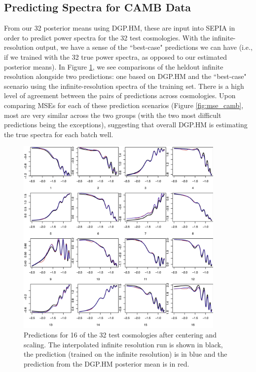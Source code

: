 \documentclass[11pt]{article}
\begin{document}
\subsection{Predicting Spectra for CAMB Data}
\label{subsec:camb_pred}

From our 32 posterior means using DGP.HM, these are input into SEPIA in order to predict power spectra
for the 32 test cosmologies. With the infinite-resolution output, we have a sense of the ``best-case" 
predictions we can have (i.e., if we trained with the 32 true power spectra, as opposed to our 
estimated posterior means). In Figure \ref{fig:pca_preds_v_camb}, we see comparisons of the heldout 
infinite resolution alongside two predictions: one based on DGP.HM and the ``best-case" scenario using the
infinite-resolution spectra of the training set. There is a high level of agreement between the pairs
of predictions across cosmologies. Upon comparing MSEs for each of these prediction scenarios 
(Figure \ref{fig:mse_camb}, most are very similar across the two groups (with the two most difficult 
predictions being the exceptions), suggesting that overall DGP.HM is estimating the true spectra 
for each batch well.

\begin{figure}
    \centering
    \includegraphics[width=4in]{preds_diff1_4_8.jpg}
    \caption{Predictions for 16 of the 32 test cosmologies after centering and scaling. 
             The interpolated infinite resolution run is shown in black, the prediction 
             (trained on the infinite resolution) is in blue and the prediction from 
             the DGP.HM posterior mean is in red.}   
    \label{fig:pca_preds_v_camb}
\end{figure}
\end{document}
